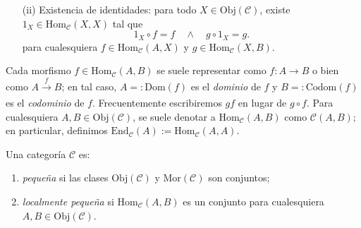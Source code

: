 \documentclass[tesis]{subfiles}
\begin{document}
\begin{Def}
\begin{itemize}
\begin{itemize}
\begin{itemize}
                \item[(ii)] Existencia de identidades: para todo $X\in\text{Obj}(\mathscr{C})$, existe $1_X\in\text{Hom}_\mathscr{C}(X,X)$ tal que 
                    \[
                    1_X\circ f = f \quad \land \quad g\circ 1_X = g.
                    \] 
                    para cualesquiera $f\in\text{Hom}_\mathscr{C}(A,X)$ y $g\in\text{Hom}_\mathscr{C}(X,B)$.
            \end{itemize}
        \end{itemize}
    \end{itemize}

    \noindent Cada morfismo $f\in\text{Hom}_\mathscr{C}(A,B)$ se suele representar como $f:A\to B$ o bien como $A\xrightarrow[]{f}B$; en tal caso, $A=:\text{Dom}(f)$ es el \emph{dominio} de $f$ y $B=:\text{Codom}(f)$ es el \emph{codominio} de $f$. Frecuentemente escribiremos $gf$ en lugar de $g\circ f$. Para cualesquiera $A,B\in\text{Obj}(\mathscr{C})$, se suele denotar a $\text{Hom}_\mathscr{C}(A,B)$ como $\mathscr{C}(A,B)$; en particular, definimos $\text{End}_\mathscr{C}(A):= \text{Hom}_\mathscr{C}(A,A)$.
\end{Def}

\begin{Def}\label{Def: Categoría pequeña}
    Una categoría $\mathscr{C}$ es:
    \begin{enumerate}[label=(\alph*)]
    
        \item \emph{pequeña} si las clases $\text{Obj}(\mathscr{C})$ y $\text{Mor}(\mathscr{C})$ son conjuntos;

        \item \emph{localmente pequeña} si $\text{Hom}_\mathscr{C}(A,B)$ es un conjunto para cualesquiera $A,B\in\text{Obj}(\mathscr{C})$.
    \end{enumerate}
\end{Def}
\end{document}
